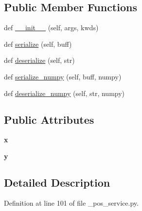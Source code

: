 \subsection*{Public Member Functions}
\begin{DoxyCompactItemize}
\item 
def \hyperlink{classpos__server_1_1srv_1_1__pos__service_1_1pos__serviceResponse_ad18922282c847215e4ac28d1c3cfb1fa}{\+\_\+\+\_\+init\+\_\+\+\_\+} (self, args, kwds)
\item 
def \hyperlink{classpos__server_1_1srv_1_1__pos__service_1_1pos__serviceResponse_a0e8e23b6c3e7cae84817c64f16a0a34b}{serialize} (self, buff)
\item 
def \hyperlink{classpos__server_1_1srv_1_1__pos__service_1_1pos__serviceResponse_ab47ab86d54dc948d26a720a9cc460737}{deserialize} (self, str)
\item 
def \hyperlink{classpos__server_1_1srv_1_1__pos__service_1_1pos__serviceResponse_afde6879b233d4702a5ad83511e9414a2}{serialize\+\_\+numpy} (self, buff, numpy)
\item 
def \hyperlink{classpos__server_1_1srv_1_1__pos__service_1_1pos__serviceResponse_a764cf16549b8ac03af2308938df6e856}{deserialize\+\_\+numpy} (self, str, numpy)
\end{DoxyCompactItemize}
\subsection*{Public Attributes}
\begin{DoxyCompactItemize}
\item 
\mbox{\label{classpos__server_1_1srv_1_1__pos__service_1_1pos__serviceResponse_a0ddfa751fc78dcf99de495df6488e902}} 
{\bfseries x}
\item 
\mbox{\label{classpos__server_1_1srv_1_1__pos__service_1_1pos__serviceResponse_abb3ac8009ca191ab47a4eb08012404c5}} 
{\bfseries y}
\end{DoxyCompactItemize}


\subsection{Detailed Description}


Definition at line 101 of file \+\_\+pos\+\_\+service.\+py.



